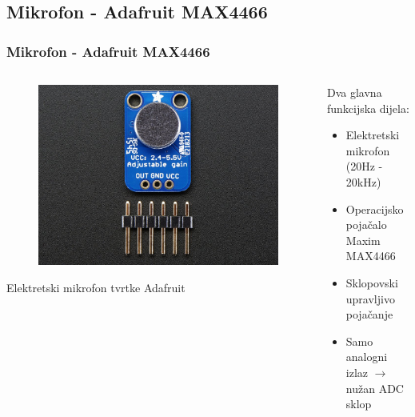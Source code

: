 \documentclass[12pt]{beamer}
\begin{document}
\subsection{Mikrofon - Adafruit MAX4466}
\begin{frame}
	\frametitle{Mikrofon - Adafruit MAX4466}
	\begin{columns}[T]
	    \begin{column}{.5\textwidth}
		\begin{figure}[h]
			\begin{minipage}{\textwidth}
				\centering
				\includegraphics[width=\linewidth]{slike/4466.jpg}
			\end{minipage}
		\end{figure}
		Elektretski mikrofon tvrtke Adafruit
		\end{column}

		\begin{column}{.5\textwidth}
			Dva glavna funkcijska dijela:
			\begin{itemize}
				\item Elektretski mikrofon (20Hz - 20kHz)
				\item Operacijsko pojačalo Maxim MAX4466
			\end{itemize}
			\begin{itemize}
				\item Sklopovski upravljivo pojačanje
				\item Samo analogni izlaz $\longrightarrow$ nužan ADC sklop
			\end{itemize}
		\end{column}
	\end{columns}
\end{frame}
\end{document}
